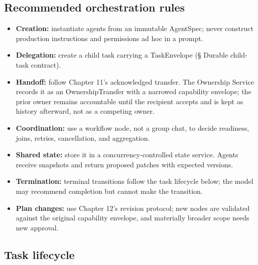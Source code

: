 \subsection{Recommended orchestration rules}

\begin{itemize}

\item \textbf{Creation:} instantiate agents from an immutable AgentSpec; never construct production instructions and permissions ad hoc in a prompt.

\item \textbf{Delegation:} create a child task carrying a TaskEnvelope (§ Durable child-task contract).

\item \textbf{Handoff:} follow Chapter 11's acknowledged transfer. The Ownership Service records it as an OwnershipTransfer with a narrowed capability envelope; the prior owner remains accountable until the recipient accepts and is kept as history afterward, not as a competing owner.

\item \textbf{Coordination:} use a workflow node, not a group chat, to decide readiness, joins, retries, cancellation, and aggregation.

\item \textbf{Shared state:} store it in a concurrency-controlled state service. Agents receive snapshots and return proposed patches with expected versions.

\item \textbf{Termination:} terminal transitions follow the task lifecycle below; the model may recommend completion but cannot make the transition.

\item \textbf{Plan changes:} use Chapter 12's revision protocol; new nodes are validated against the original capability envelope, and materially broader scope needs new approval.

\end{itemize}

\subsection{Task lifecycle}

